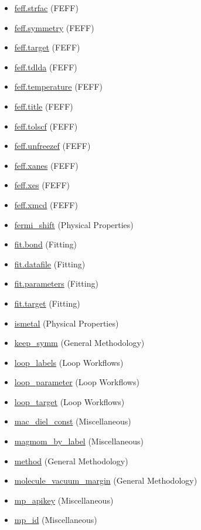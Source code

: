 \documentclass[11pt]{article}
\begin{document}
\begin{itemize}
\item \hyperref[kw:feff-strfac]{feff.strfac} (FEFF)
\item \hyperref[kw:feff-symmetry]{feff.symmetry} (FEFF)
\item \hyperref[kw:feff-target]{feff.target} (FEFF)
\item \hyperref[kw:feff-tdlda]{feff.tdlda} (FEFF)
\item \hyperref[kw:feff-temperature]{feff.temperature} (FEFF)
\item \hyperref[kw:feff-title]{feff.title} (FEFF)
\item \hyperref[kw:feff-tolscf]{feff.tolscf} (FEFF)
\item \hyperref[kw:feff-unfreezef]{feff.unfreezef} (FEFF)
\item \hyperref[kw:feff-xanes]{feff.xanes} (FEFF)
\item \hyperref[kw:feff-xes]{feff.xes} (FEFF)
\item \hyperref[kw:feff-xmcd]{feff.xmcd} (FEFF)
\item \hyperref[kw:fermi-shift]{fermi\_shift} (Physical Properties)
\item \hyperref[kw:fit-bond]{fit.bond} (Fitting)
\item \hyperref[kw:fit-datafile]{fit.datafile} (Fitting)
\item \hyperref[kw:fit-parameters]{fit.parameters} (Fitting)
\item \hyperref[kw:fit-target]{fit.target} (Fitting)
\item \hyperref[kw:ismetal]{ismetal} (Physical Properties)
\item \hyperref[kw:keep-symm]{keep\_symm} (General Methodology)
\item \hyperref[kw:loop-labels]{loop\_labels} (Loop Workflows)
\item \hyperref[kw:loop-parameter]{loop\_parameter} (Loop Workflows)
\item \hyperref[kw:loop-target]{loop\_target} (Loop Workflows)
\item \hyperref[kw:mac-diel-const]{mac\_diel\_const} (Miscellaneous)
\item \hyperref[kw:magmom-by-label]{magmom\_by\_label} (Miscellaneous)
\item \hyperref[kw:method]{method} (General Methodology)
\item \hyperref[kw:molecule-vacuum-margin]{molecule\_vacuum\_margin} (General Methodology)
\item \hyperref[kw:mp-apikey]{mp\_apikey} (Miscellaneous)
\item \hyperref[kw:mp-id]{mp\_id} (Miscellaneous)

\end{itemize}
\end{document}
